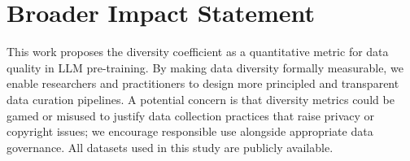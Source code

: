 \documentclass[10pt]{article}
\begin{document}
\section*{Broader Impact Statement}
This work proposes the diversity coefficient as a quantitative metric for data quality in LLM pre-training.
By making data diversity formally measurable, we enable researchers and practitioners to design more principled and transparent data curation pipelines.
A potential concern is that diversity metrics could be gamed or misused to justify data collection practices that raise privacy or copyright issues; we encourage responsible use alongside appropriate data governance.
All datasets used in this study are publicly available.





\appendix


\end{document}
